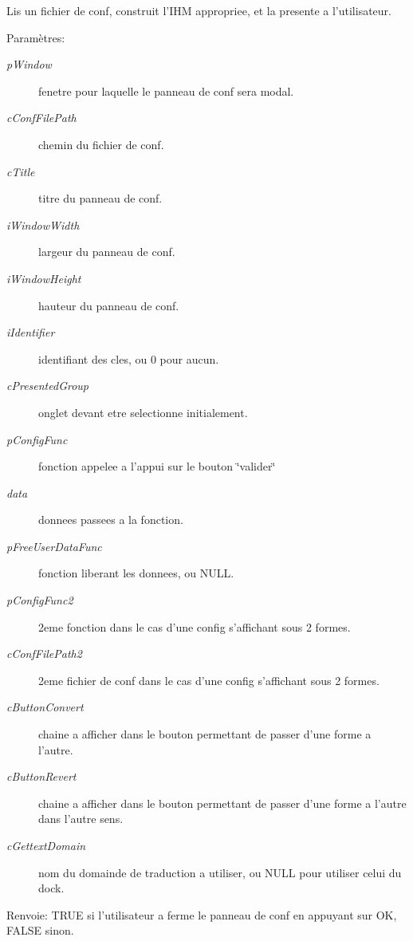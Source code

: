 Lis un fichier de conf, construit l'IHM appropriee, et la presente a l'utilisateur. \begin{Desc}
\item[Paramètres:]
\begin{description}
\item[{\em pWindow}]fenetre pour laquelle le panneau de conf sera modal. \item[{\em cConfFilePath}]chemin du fichier de conf. \item[{\em cTitle}]titre du panneau de conf. \item[{\em iWindowWidth}]largeur du panneau de conf. \item[{\em iWindowHeight}]hauteur du panneau de conf. \item[{\em iIdentifier}]identifiant des cles, ou 0 pour aucun. \item[{\em cPresentedGroup}]onglet devant etre selectionne initialement. \item[{\em pConfigFunc}]fonction appelee a l'appui sur le bouton \char`\"{}valider\char`\"{} \item[{\em data}]donnees passees a la fonction. \item[{\em pFreeUserDataFunc}]fonction liberant les donnees, ou NULL. \item[{\em pConfigFunc2}]2eme fonction dans le cas d'une config s'affichant sous 2 formes. \item[{\em cConfFilePath2}]2eme fichier de conf dans le cas d'une config s'affichant sous 2 formes. \item[{\em cButtonConvert}]chaine a afficher dans le bouton permettant de passer d'une forme a l'autre. \item[{\em cButtonRevert}]chaine a afficher dans le bouton permettant de passer d'une forme a l'autre dans l'autre sens. \item[{\em cGettextDomain}]nom du domainde de traduction a utiliser, ou NULL pour utiliser celui du dock. \end{description}
\end{Desc}
\begin{Desc}
\item[Renvoie:]TRUE si l'utilisateur a ferme le panneau de conf en appuyant sur OK, FALSE sinon. \end{Desc}

